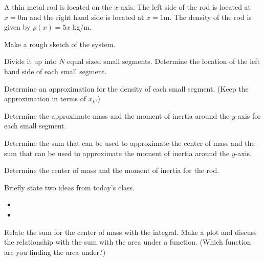 \begin{problem}
\item A thin metal rod is located on the $x$-axis. The left side of
  the rod is located at $x=0$m and the right hand side is located at
  $x=1$m. The density of the rod is given by $\rho(x)=5x$ kg/m.
  \begin{subproblem}
    \item Make a rough sketch of the system.
      \vfill
    \item Divide it up into $N$ equal sized small segments. Determine
      the location of the left hand side of each small segment.
      \vfill
    \item Determine an approximation for the density of each small
      segment. (Keep the approximation in terms of $x_k$.)
      \vfill
    \item Determine the approximate mass and the moment of inertia
      around the $y$-axis for each small segment.
      \vfill

      \clearpage

    \item Determine the sum that can be used to approximate the center
      of mass and the sum that can be used to approximate the moment
      of inertia around the $y$-axis.

      \vfill

    \item Determine the center of mass and the moment of inertia for
      the rod.

      \vfill
      \vfill

  \end{subproblem}
\end{problem}

\postClass

\begin{problem}
\item Briefly state two ideas from today's class.
  \begin{itemize}
  \item
  \item
  \end{itemize}
\item Relate the sum for the center of mass with the integral. Make a
  plot and discuss the relationship with the sum with the area under a
  function. (Which function are you finding the area under?)

  \vfill
\end{problem}


